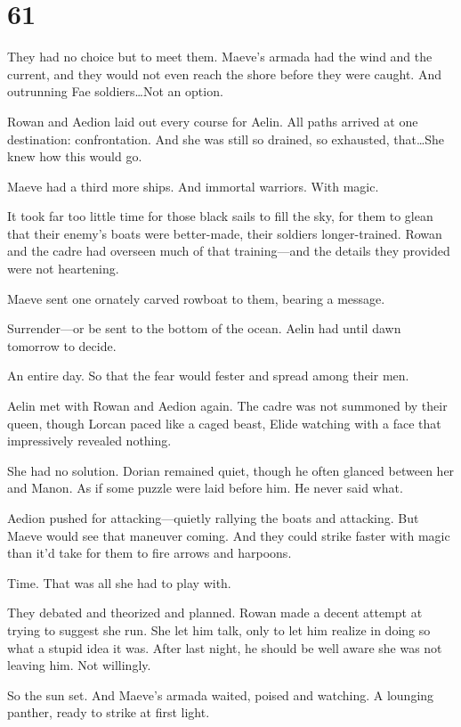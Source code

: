 
\chapter{61}

They had no choice but to meet them.
Maeve's armada had the wind and the current, and they would not even reach the shore before they were caught.
And outrunning Fae soldiers\ldots Not an option.

Rowan and Aedion laid out every course for Aelin.
All paths arrived at one destination: confrontation.
And she was still so drained, so exhausted, that\ldots She knew how this would go.

Maeve had a third more ships.
And immortal warriors.
With magic.

It took far too little time for those black sails to fill the sky, for them to glean that their enemy's boats were better-made, their soldiers longer-trained.
Rowan and the cadre had overseen much of that training---and the details they provided were not heartening.

Maeve sent one ornately carved rowboat to them, bearing a message.

Surrender---or be sent to the bottom of the ocean.
Aelin had until dawn tomorrow to decide.

An entire day.
So that the fear would fester and spread among their men.

Aelin met with Rowan and Aedion again.
The cadre was not summoned by their queen, though Lorcan paced like a caged beast, Elide watching with a face that impressively revealed nothing.

She had no solution.
Dorian remained quiet, though he often glanced between her and Manon.
As if some puzzle were laid before him.
He never said what.

Aedion pushed for attacking---quietly rallying the boats and attacking.
But Maeve would see that maneuver coming.
And they could strike faster with magic than it'd take for them to fire arrows and harpoons.

Time.
That was all she had to play with.

They debated and theorized and planned.
Rowan made a decent attempt at trying to suggest she run.
She let him talk, only to let him realize in doing so what a stupid idea it was.
After last night, he should be well aware she was not leaving him.
Not willingly.

So the sun set.
And Maeve's armada waited, poised and watching.
A lounging panther, ready to strike at first light.

